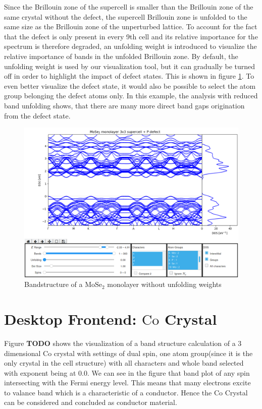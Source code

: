 Since the Brillouin zone of the supercell is smaller than the Brillouin zone of the same crystal without the defect, the supercell Brillouin zone is unfolded to the same size as the Brillouin zone of the unperturbed lattice. To account for the fact that the defect is only present in every 9th cell and its relative importance for the spectrum is therefore degraded, an unfolding weight is introduced to visualize the relative importance of bands in the unfolded Brillouin zone. By default, the unfolding weight is used by our visualization tool, but it can gradually be turned off in order to highlight the impact of defect states. This is shown in figure \ref{example3}. To even better visualize the defect state, it would also be possible to select the atom group belonging the defect atoms only. In this example, the analysis with reduced band unfolding shows, that there are many more direct band gaps origination from the defect state.


\begin{figure}[htb!]
    \centering
    \includegraphics[width=1.0\linewidth]{img/gui_web_mose2_monolayer_unfold-0.png}
    \caption{Bandstructure of a $\textrm{MoSe}_2$ monolayer without unfolding weights}
    \label{example3}
\end{figure}


\section{Desktop Frontend: $\textrm{Co}$ Crystal}

Figure  \textbf{TODO} shows the visualization of a band structure calculation of a 3 dimensional Co crystal with settings of dual spin, one atom group(since it is the only crystal in the cell structure) with all characters and whole band selected with exponent being at $0.0$. We can see in the figure that band plot of any spin intersecting with the Fermi energy level. This means that many electrons excite to valance band which is a characteristic of a conductor. Hence the Co Crystal can be considered and concluded as conductor material.

